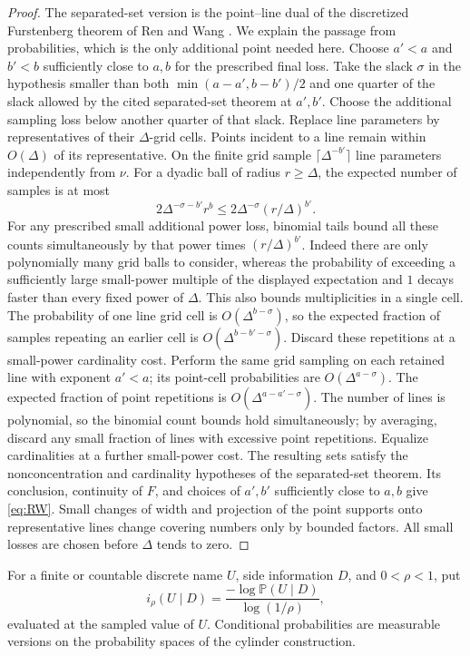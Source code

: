 \begin{proof}
The separated-set version is the point--line dual of the discretized
Furstenberg theorem of Ren and Wang \cite[Theorem 4.1]{RenWang2025}.
We explain the passage from probabilities, which is the only additional
point needed here. Choose $a'<a$ and $b'<b$ sufficiently close to $a,b$
for the prescribed final loss. Take the slack $\sigma$ in the hypothesis
smaller than both $\min(a-a',b-b')/2$ and one quarter of the slack
allowed by the cited separated-set theorem at $a',b'$. Choose the
additional sampling loss below another quarter of that slack. Replace
line parameters by
representatives of their $\Delta$-grid cells. Points incident to a line
remain within $O(\Delta)$ of its representative. On the finite grid sample
$\lceil\Delta^{-b'}\rceil$ line parameters independently from $\nu$.
For a dyadic ball of radius $r\geq\Delta$, the expected number of samples is
at most
\[
 2\Delta^{-\sigma-b'}r^b
 \leq 2\Delta^{-\sigma}(r/\Delta)^{b'}.
\]
For any prescribed small additional power loss, binomial tails bound all
these counts simultaneously by that power times $(r/\Delta)^{b'}$.
Indeed there are only polynomially many grid balls to consider, whereas
the probability of exceeding a sufficiently large small-power multiple
of the displayed expectation and $1$ decays faster than every fixed
power of $\Delta$. This also bounds multiplicities in a single cell.
The probability of one line grid cell is $O(\Delta^{b-\sigma})$, so the
expected fraction of samples repeating an earlier cell is
$O(\Delta^{b-b'-\sigma})$. Discard these repetitions at a small-power
cardinality cost. Perform the same grid sampling on each retained line
with exponent $a'<a$; its point-cell probabilities are
$O(\Delta^{a-\sigma})$. The expected fraction of point repetitions is
$O(\Delta^{a-a'-\sigma})$. The number of lines is polynomial, so the
binomial count bounds hold simultaneously; by averaging, discard any
small fraction of lines with excessive point repetitions. Equalize
cardinalities at a further small-power cost. The resulting sets satisfy
the nonconcentration and cardinality hypotheses of the separated-set
theorem. Its conclusion,
continuity of $F$, and choices of $a',b'$ sufficiently close to $a,b$ give
\eqref{eq:RW}. Small changes of width and projection of the point supports
onto representative lines change covering numbers only by bounded
factors. All small losses are chosen before $\Delta$ tends to zero.
\end{proof}

For a finite or countable discrete name $U$, side information $D$, and
$0<\rho<1$, put
\[
 i_\rho(U\mid D)
 =\frac{-\log\mathbb P(U\mid D)}{\log(1/\rho)},
\]
evaluated at the sampled value of $U$. Conditional probabilities are
measurable versions on the probability spaces of the cylinder construction.

